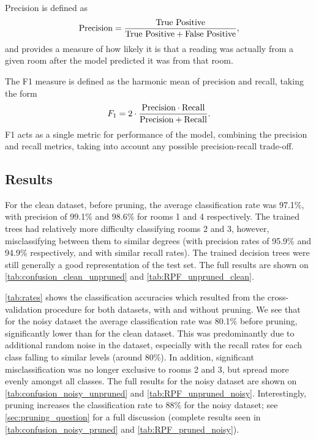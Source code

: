 \documentclass[11pt,twoside]{article}
\begin{document}
Precision is defined as
\begin{equation}
\textnormal{Precision}=\frac{\textnormal{True Positive}}{\textnormal{True Positive}+\textnormal{False Positive}},
\end{equation}
and provides a measure of how likely it is that a reading was actually from a given room after the model predicted it was from that room.

The F1 measure is defined as the harmonic mean of precision and recall, taking the form
\begin{equation}
F_{1}=2\cdot\frac{\textnormal{Precision}\cdot \textnormal{Recall}}{\textnormal{Precision}+\textnormal{Recall}}.
\end{equation}
F1 acts as a single metric for performance of the model, combining the precision and recall metrics, taking into account any possible precision-recall trade-off.



\subsection{Results}
For the clean dataset, before pruning, the average classification rate was 97.1\%, with precision of 99.1\% and 98.6\% for rooms 1 and 4 respectively. The trained trees had relatively more difficulty classifying rooms 2 and 3, however, misclassifying between them to similar degrees (with precision rates of 95.9\% and 94.9\% respectively, and with similar recall rates). The trained decision trees were still generally a good representation of the test set. The full results are shown on \autoref{tab:confusion_clean_unpruned} and \autoref{tab:RPF_unpruned_clean}.

\autoref{tab:rates} shows the classification accuracies which resulted from the cross-validation procedure for both datasets, with and without pruning. We see that for the noisy dataset the average classification rate was 80.1\% before pruning, significantly lower than for the clean dataset. This was predominantly due to additional random noise in the dataset, especially with the recall rates for each class falling to similar levels (around 80\%). In addition, significant misclassification was no longer exclusive to rooms 2 and 3, but spread more evenly amongst all classes. The full results for the noisy dataset are shown on \autoref{tab:confusion_noisy_unpruned} and \autoref{tab:RPF_unpruned_noisy}. Interestingly, pruning increases the classification rate to 88\% for the noisy dataset; see \autoref{sec:pruning_question} for a full discussion (complete results seen in  \autoref{tab:confusion_noisy_pruned} and \autoref{tab:RPF_pruned_noisy}). 
\end{document}
